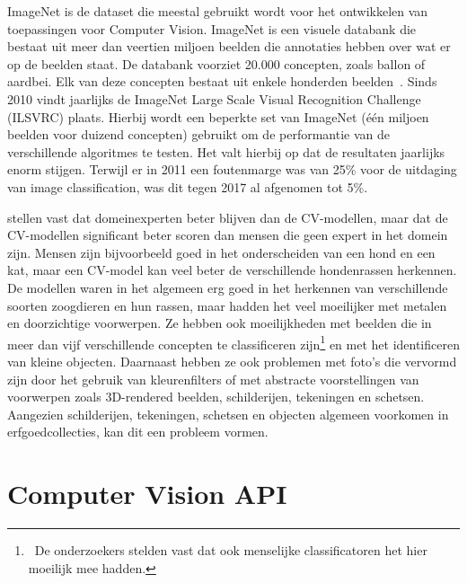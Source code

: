 ImageNet is de dataset die meestal gebruikt wordt voor het ontwikkelen van toepassingen voor Computer Vision. ImageNet is een visuele databank die bestaat uit meer dan veertien miljoen beelden die annotaties hebben over wat er op de beelden staat. De databank voorziet 20.000 concepten, zoals ballon of aardbei. Elk van deze concepten bestaat uit enkele honderden beelden~\autocites{WikiImageNet}{Brownlee2019a}. Sinds 2010 vindt jaarlijks de ImageNet Large Scale Visual Recognition Challenge (ILSVRC) plaats. Hierbij wordt een beperkte set van ImageNet (één miljoen beelden voor duizend concepten) gebruikt om de performantie van de verschillende algoritmes te testen. Het valt hierbij op dat de resultaten jaarlijks enorm stijgen. Terwijl er in 2011 een foutenmarge was van 25\% voor de uitdaging van image classification, was dit tegen 2017 al afgenomen tot 5\%. 

\textcite{Russakovsky2014} stellen vast dat domeinexperten beter blijven dan de CV-modellen, maar dat de CV-modellen significant beter scoren dan mensen die geen expert in het domein zijn. Mensen zijn bijvoorbeeld goed in het onderscheiden van een hond en een kat, maar een CV-model kan veel beter de verschillende hondenrassen herkennen. De modellen waren in het algemeen erg goed in het herkennen van verschillende soorten zoogdieren en hun rassen, maar hadden het veel moeilijker met metalen en doorzichtige voorwerpen. Ze hebben ook moeilijkheden met beelden die in meer dan vijf verschillende concepten te classificeren zijn\footnote{~De onderzoekers stelden vast dat ook menselijke classificatoren het hier moeilijk mee hadden.} en met het identificeren van kleine  objecten. Daarnaast hebben ze ook problemen met foto’s die vervormd zijn door het gebruik van kleurenfilters  of met abstracte voorstellingen van voorwerpen zoals 3D-rendered beelden, schilderijen, tekeningen en schetsen. Aangezien schilderijen, tekeningen, schetsen en objecten algemeen voorkomen in erfgoedcollecties, kan dit een probleem vormen.

\section{Computer Vision API}
\label{sec:CV-API}

